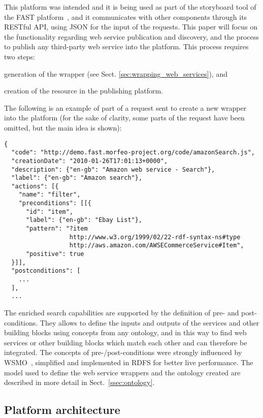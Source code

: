 This platform was intended and it is being used as part of the storyboard tool of the FAST platform~\cite{hoyer2009fast}, and it communicates with other components through its RESTful API, using JSON for the input of the requests. This paper will focus on the functionality regarding web service publication and discovery, and the process to publish any third-party web service into the platform. This process requires two steps:
\begin{inparaenum}[(i)]
	\item generation of the wrapper (see Sect. \ref{sec:wrapping_web_services}), and 
	\item creation of the resource in the publishing platform. 
\end{inparaenum}
The following is an example of part of a request sent to create a new wrapper into the platform (for the sake of clarity, some parts of the request have been omitted, but the main idea is shown):

\begin{listing}
\begin{verbatim}
{
  "code": "http://demo.fast.morfeo-project.org/code/amazonSearch.js",
  "creationDate": "2010-01-26T17:01:13+0000",
  "description": {"en-gb": "Amazon web service - Search"},
  "label": {"en-gb": "Amazon search"},
  "actions": [{
    "name": "filter",
    "preconditions": [[{
      "id": "item",
      "label": {"en-gb": "Ebay List"},
      "pattern": "?item
                  http://www.w3.org/1999/02/22-rdf-syntax-ns#type
                  http://aws.amazon.com/AWSECommerceService#Item",
      "positive": true
  }]],
  "postconditions": [
    ...
  ],
  ...
\end{verbatim}
\label{lis:json_request}
\end{listing}

The enriched search capabilities are supported by the definition of pre- and post-conditions. They allows to define the inputs and outputs of the services and other building blocks using concepts from any ontology, and in this way to find web services or other building blocks which match each other and can therefore be integrated. The concepts of pre-/post-conditions were strongly influenced by WSMO~\cite{roman2005}, simplified and implemented in RDFS for better live performance. The model used to define the web service wrappers and the ontology created are described in more detail in Sect.~\ref{ssec:ontology}.

\subsection{Platform architecture}
\label{ssec:architecture}

